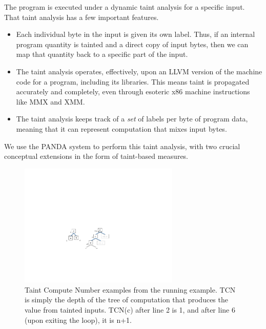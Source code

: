 The program is executed under a dynamic taint analysis for a specific input.
That taint analysis has a few important features.
\begin{itemize}
\item Each individual byte in the input is given its own label.
Thus, if an internal program quantity is tainted and a direct copy of input bytes, then we can map that quantity back to a specific part of the input.  
\item The taint analysis operates, effectively, upon an LLVM version of the machine code for a program, including its libraries.
This means taint is propagated accurately and completely, even through esoteric x86 machine instructions like MMX and XMM.
\item The taint analysis keeps track of a \emph{set} of labels per byte of program data, meaning that it can represent computation that mixes input bytes.
\end{itemize}
We use the PANDA system to perform this taint analysis, with two crucial conceptual extensions in the form of taint-based measures.


\begin{figure}
\centering
\includegraphics[width=3in]{tcn.pdf}
\caption{Taint Compute Number examples from the running example.  
TCN is simply the depth of the tree of computation that produces the value from tainted inputs.
TCN(c) after line 2 is 1, and after line 6 (upon exiting the loop), it is n+1.}
\label{fig:taint-compute-number}
\end{figure}


